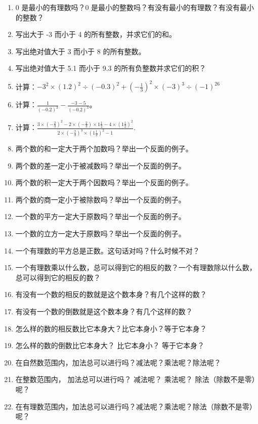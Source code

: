 \begin{enumerate}
\item
  0 是最小的有理数吗？0
  是最小的整数吗？有没有最小的有理数？有没有最小的整数？
\item
  写出大于 -3 而小于 4 的所有整数，并求它们的和。
\item
  写出绝对值大于 3 而小于 8 的所有整数。
\item
  写出绝对值大于 5.1 而小于 9.3 的所有负整数并求它们的积？
\item
  计算：\(-3^{2} \times (1.2)^{2} \div (-0.3)^{2} + \left(-\frac{1}{3}\right)^{2} \times (-3)^{3} \div (-1)^{26}\)
\item
  计算：\(\frac{1}{(-0.2)^3} - \frac{-3 - 5}{(-0.2)^3}\)。
\item
  计算：\(\frac{3\times\left(-\frac{2}{3}\right)^{2}-2\times\left(-\frac{2}{3}\right)\times1\frac{1}{2}-4\times\left(1\frac{1}{2}\right)^{2}}{2\times\left(-\frac{2}{3}\right)^{3}\times\left(1\frac{1}{2}\right)^{2}-1}.\)
\item
  两个数的和一定大于两个加数吗？举出一个反面的例子。
\item
  两个数的差一定小于被减数吗？举出一个反面的例子。
\item
  两个数的积一定大于两个因数吗？举出一个反面的例子。
\item
  两个数的商一定小于被除数吗？举出一个反面的例子。
\item
  一个数的平方一定大于原数吗？举出一个反面的例子。
\item
  一个数的立方一定大于原数吗？举出一个反面的例子。
\item
  一个有理数的平方总是正数。这句话对吗？什么时候不对？
\item
  一个有理数乘以什么数，总可以得到它的相反的数？一个有理数除以什么数，总可以得到它的相反的数？
\item
  有没有一个数的相反的数就是这个数本身？有几个这样的数？
\item
  有没有一个数的倒数就是这个数本身？有几个这样的数？
\item
  怎么样的数的相反数比它本身大？比它本身小？等于它本身？
\item
  怎么样的数的倒数比它本身大？ 比它本身小？ 等于它本身？
\item
  在自然数范围内，加法总可以进行吗？减法呢？乘法呢？除法呢？
\item
  在整数范围内， 加法总可以进行吗？ 减法呢？ 乘法呢？
  除法（除数不是零）呢？
\item
  在有理数范围内，加法总可以进行吗？减法呢？乘法呢？除法（除数不是零）呢？
\end{enumerate}

